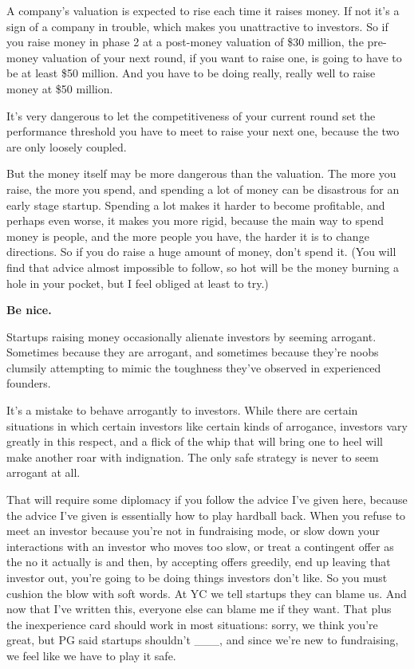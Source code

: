 \documentclass[12pt]{book}
\begin{document}
A company's valuation is expected to rise each time it raises money. If
not it's a sign of a company in trouble, which makes you unattractive to
investors. So if you raise money in phase 2 at a post-money valuation of
\$30 million, the pre-money valuation of your next round, if you want to
raise one, is going to have to be at least \$50 million. And you have to
be doing really, really well to raise money at \$50 million.

It's very dangerous to let the competitiveness of your current round set
the performance threshold you have to meet to raise your next one,
because the two are only loosely coupled.

But the money itself may be more dangerous than the valuation. The more
you raise, the more you spend, and spending a lot of money can be
disastrous for an early stage startup. Spending a lot makes it harder to
become profitable, and perhaps even worse, it makes you more rigid,
because the main way to spend money is people, and the more people you
have, the harder it is to change directions. So if you do raise a huge
amount of money, don't spend it. (You will find that advice almost
impossible to follow, so hot will be the money burning a hole in your
pocket, but I feel obliged at least to try.)

\textbf{Be nice.}

Startups raising money occasionally alienate investors by seeming
arrogant. Sometimes because they are arrogant, and sometimes because
they're noobs clumsily attempting to mimic the toughness they've
observed in experienced founders.

It's a mistake to behave arrogantly to investors. While there are
certain situations in which certain investors like certain kinds of
arrogance, investors vary greatly in this respect, and a flick of the
whip that will bring one to heel will make another roar with
indignation. The only safe strategy is never to seem arrogant at all.

That will require some diplomacy if you follow the advice I've given
here, because the advice I've given is essentially how to play hardball
back. When you refuse to meet an investor because you're not in
fundraising mode, or slow down your interactions with an investor who
moves too slow, or treat a contingent offer as the no it actually is and
then, by accepting offers greedily, end up leaving that investor out,
you're going to be doing things investors don't like. So you must
cushion the blow with soft words. At YC we tell startups they can blame
us. And now that I've written this, everyone else can blame me if they
want. That plus the inexperience card should work in most situations:
sorry, we think you're great, but PG said startups shouldn't \_\_\_, and
since we're new to fundraising, we feel like we have to play it safe.
\end{document}
